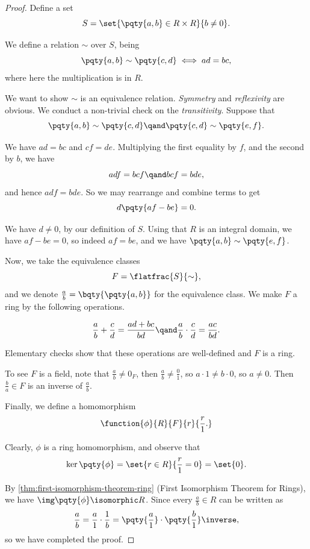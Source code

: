 \begin{proof}
    Define a set
    \[
        S = \set{\pqty{a, b} \in R \times R}{b \neq 0}.
    \]

    We define a relation \(\sim\) over \(S\), being
    \[
        \pqty{a, b} \sim \pqty{c, d} \iff ad = bc,
    \]
    where here the multiplication is in \(R\).

    We want to show \(\sim\) is an equivalence relation. \emph{Symmetry} and \emph{reflexivity} are obvious. We conduct a non-trivial check on the \emph{transitivity}. Suppose that
    \[
        \pqty{a, b} \sim \pqty{c, d} \qand \pqty{c, d} \sim \pqty{e, f}.
    \]

    We have \(ad = bc\) and \(cf = de\). Multiplying the first equality by \(f\), and the second by \(b\), we have
    \[
        adf = bcf \qand bcf = bde,
    \]
    and hence \(adf = bde\). So we may rearrange and combine terms to get
    \[
        d \pqty{af - be} = 0.
    \]

    We have \(d \neq 0\), by our definition of \(S\). Using that \(R\) is an integral domain, we have \(af - be = 0\), so indeed \(af = be\), and we have \(\pqty{a, b} \sim \pqty{e, f}\).

    Now, we take the equivalence classes
    \[
        F = \flatfrac{S}{\sim},
    \]
    and we denote \(\frac{a}{b} = \bqty{\pqty{a, b}}\) for the equivalence class. We make \(F\) a ring by the following operations.

    \[
        \frac{a}{b} + \frac{c}{d} = \frac{ad + bc}{bd} \qand \frac{a}{b} \cdot \frac{c}{d} = \frac{ac}{bd}.
    \]

    Elementary checks show that these operations are well-defined and \(F\) is a ring.

    To see \(F\) is a field, note that \(\frac{a}{b} \neq 0_F\), then \(\frac{a}{b} \neq \frac{0}{1}\), so \(a \cdot 1 \neq b \cdot 0\), so \(a \neq 0\). Then \(\frac{b}{a} \in F\) is an inverse of \(\frac{a}{b}\).

    Finally, we define a homomorphism
    \[
        \function{\phi}{R}{F}{r}{\frac{r}{1}.}
    \]

    Clearly, \(\phi\) is a ring homomorphism, and observe that
    \[
        \ker\pqty{\phi} = \set{r \in R}{\frac{r}{1} = 0} = \set{0}.
    \]

    By \autoref{thm:first-isomorphism-theorem-ring} (First Isomorphism Theorem for Rings), we have \(\img \pqty{\phi} \isomorphic R\). Since every \(\frac{a}{b} \in R\) can be written as
    \[
        \frac{a}{b} = \frac{a}{1} \cdot \frac{1}{b} = \pqty{\frac{a}{1}} \cdot \pqty{\frac{b}{1}}\inverse, 
    \]
    so we have completed the proof.
\end{proof}

